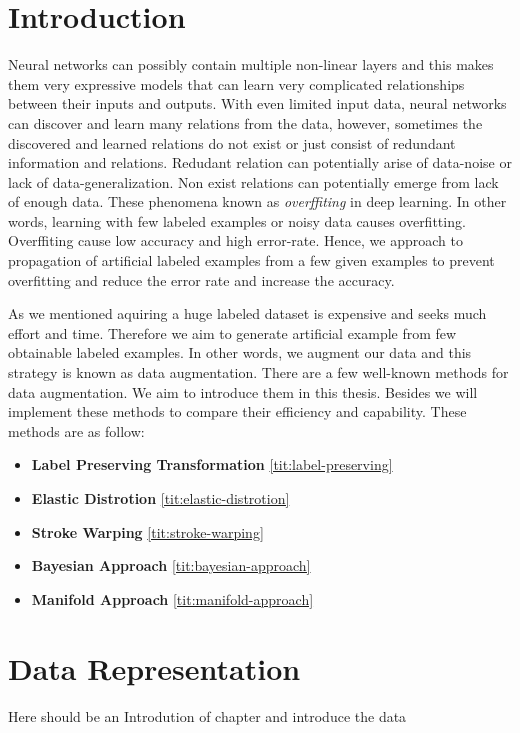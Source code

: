\chapter{Introduction}

Neural networks can possibly contain multiple non-linear layers and this makes them very expressive models
that can learn very complicated relationships between their inputs and outputs. With even limited
input data, neural networks can discover and learn many relations from the data, however, sometimes the
discovered and learned relations do not exist or just consist of redundant information and
relations. Redudant relation can potentially arise of data-noise or lack of data-generalization. Non
exist relations can potentially emerge from lack of enough data. These phenomena known as
\textit{overffiting} in deep learning. In other words, learning with few labeled examples or noisy
data causes overfitting. Overffiting cause low accuracy and high error-rate. Hence, we approach to propagation of artificial
labeled examples from a few given examples to prevent overfitting and reduce the error rate and increase
the accuracy.

As we mentioned aquiring a huge labeled dataset is expensive and seeks much effort and time. Therefore we aim to generate artificial example from few obtainable labeled examples. In other words, we
augment our data and this strategy is known as data augmentation. There are a few well-known methods for data augmentation. We aim to introduce them in this thesis.  Besides we will implement these
methods to compare their efficiency and capability. These methods are as follow:
\begin{itemize}
  \item \textbf{Label Preserving Transformation} \ref{tit:label-preserving}
  \item \textbf{Elastic Distrotion} \ref{tit:elastic-distrotion}
  \item \textbf{Stroke Warping} \ref{tit:stroke-warping}
  \item \textbf{Bayesian Approach} \ref{tit:bayesian-approach}
  \item \textbf{Manifold Approach} \ref{tit:manifold-approach}
\end{itemize}



\chapter{Data Representation}
Here should be an Introdution of chapter and introduce the data

